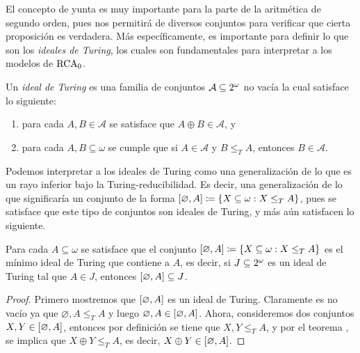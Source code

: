 \begin{agregado}
\begin{agregado}
El concepto de yunta es muy importante para la parte de la aritmética de segundo orden, pues nos permitirá  de diversos conjuntos para verificar que cierta proposición es verdadera. Más específicamente, es importante para definir lo que son los \emph{ideales de Turing}, los cuales son fundamentales para interpretar a los modelos de $\RCA$.

\begin{definition}
	\label{def: ideal_turing}
	Un \emph{ideal de Turing} es una familia de conjuntos $\mathcal{A}\subseteq\CPOTENCIA{\omega}$ no vacía la cual satisface lo siguiente:
	\begin{enumerate}
		\item para cada $A, B\in\mathcal{A}$ se satisface que $A\oplus B\in\mathcal{A}$, y
		\item para cada $A, B\subseteq\omega$ se cumple que si $A\in\mathcal{A}$ y $B\leq_{T} A$, entonces $B\in\mathcal{A}$.
	\end{enumerate}
\end{definition}

Podemos interpretar a los ideales de Turing como una generalización de lo que es un rayo inferior bajo la Turing-reducibilidad. Es decir, una generalización de lo que significaría un conjunto de la forma $\bra*{\varnothing, A}\coloneqq\set*{X\subseteq\omega: X\leq_{T} A}$, pues se satisface que este tipo de conjuntos son ideales de Turing, y más aún satisfacen lo siguiente.

\begin{theorem}
	\label{theo: cono_inferior_ideal}
	Para cada $A\subseteq\omega$ se satisface que el conjunto $\bra*{\varnothing, A}\coloneqq\set*{X\subseteq\omega: X\leq_{T} A}$ es el mínimo ideal de Turing que contiene a $A$, es decir, si $J\subseteq\CPOTENCIA{\omega}$ es un ideal de Turing tal que $A\in J$, entonces $\bra*{\varnothing, A}\subseteq J$.
\end{theorem}

\begin{proof}
	Primero mostremos que $\bra*{\varnothing, A}$ es un ideal de Turing. Claramente es no vacío ya que $\varnothing, A\leq_{T} A$ y luego $\varnothing, A\in\bra*{\varnothing, A}$. Ahora, consideremos dos conjuntos $X, Y\in\bra*{\varnothing, A}$, entonces por definición se tiene que $X, Y\leq_{T} A$, y por el teorema , se implica que $X\oplus Y\leq_{T} A$, es decir, $X\oplus Y\in\bra*{\varnothing, A}$.


\end{proof}
\end{agregado}
\end{agregado}
